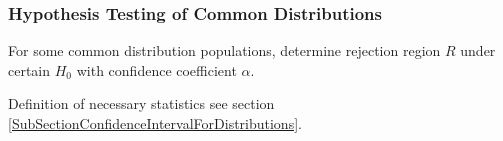         



\subsubsection{Hypothesis Testing of Common Distributions}\label{SubSectionHypothesisTestingOfCommonDistributions}
    For some common distribution populations, determine rejection region $R$ under certain $H_0$ with confidence coefficient $\alpha$.

    Definition of necessary statistics see section \hyperref[SubSectionConfidenceIntervalForDistributions]{\ref{SubSectionConfidenceIntervalForDistributions}}.

